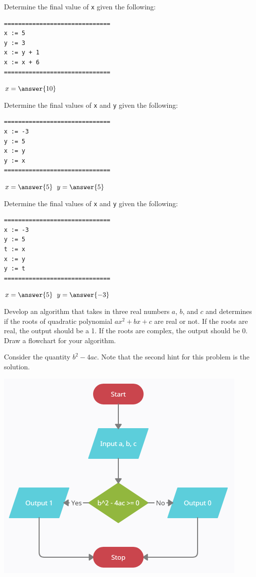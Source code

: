 \documentclass{ximera}
\begin{document}
\begin{question}
	Determine the final value of \verb|x| given the following:
	\begin{verbatim}
==============================
x := 5
y := 3
x := y + 1
x := x + 6
==============================
	\end{verbatim}   
	$x = \answer{10}$
\end{question}

\begin{question}
	Determine the final values of \verb|x| and \verb|y| given the following:
	\begin{verbatim}
==============================
x := -3
y := 5
x := y
y := x
==============================
	\end{verbatim}
	$x = \answer{5}$
	$y = \answer{5}$
\end{question}

\begin{question}
	Determine the final values of \verb|x| and \verb|y| given the following:
	\begin{verbatim}
==============================
x := -3
y := 5
t := x
x := y
y := t
==============================
	\end{verbatim}
	$x = \answer{5}$
	$y = \answer{-3}$
\end{question}

\begin{question}
	Develop an algorithm that takes in three real numbers $a$, $b$, and $c$ and determines if the roots of quadratic polynomial $ax^2+bx+c$ are real or not. If the roots are real, the output should be a 1. If the roots are complex, the output should be 0. Draw a flowchart for your algorithm.
	\begin{hint}
		Consider the quantity $b^2-4ac$. Note that the second hint for this problem is the solution.
	\end{hint}
	
	\begin{hint}
		\begin{center}
		\includegraphics{realornot.png}
		\end{center}
	\end{hint}
\end{question}
\end{document}
